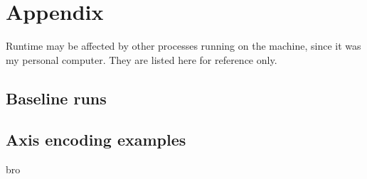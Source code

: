 \appendix

\section{Appendix}

Runtime may be affected by other processes running on the machine, since it was my personal computer. They are listed here for reference only.

\subsection{Baseline runs}
\label{appendix:baseline}


\subsection{Axis encoding examples}
\label{appendix:axis_samples}
bro

